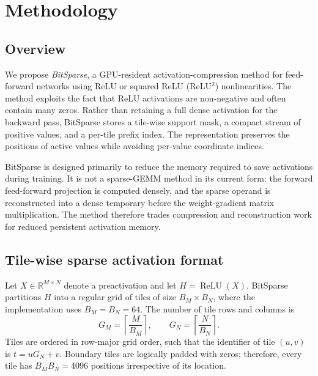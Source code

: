 
\section{Methodology}
\label{sec:methodology}

\subsection{Overview}

We propose \emph{BitSparse}, a GPU-resident activation-compression method for
feed-forward networks using ReLU or squared ReLU (ReLU$^2$) nonlinearities.
The method exploits the fact that ReLU activations are non-negative and often
contain many zeros.  Rather than retaining a full dense activation for the
backward pass, BitSparse stores a tile-wise support mask, a compact stream of
positive values, and a per-tile prefix index.  The representation preserves
the positions of active values while avoiding per-value coordinate indices.

BitSparse is designed primarily to reduce the memory required to save
activations during training.  It is not a sparse-GEMM method in its current
form: the forward feed-forward projection is computed densely, and the
sparse operand is reconstructed into a dense temporary before the
weight-gradient matrix multiplication.  The method therefore trades
compression and reconstruction work for reduced persistent activation memory.

\subsection{Tile-wise sparse activation format}
\label{sec:method-tile-format}

Let $X \in \mathbb{R}^{M \times N}$ denote a preactivation and let
$H = \operatorname{ReLU}(X)$.  BitSparse partitions $H$ into a regular grid
of tiles of size $B_M \times B_N$, where the implementation uses
$B_M=B_N=64$.  The number of tile rows and columns is
\begin{equation}
    G_M = \left\lceil \frac{M}{B_M} \right\rceil,
    \qquad
    G_N = \left\lceil \frac{N}{B_N} \right\rceil.
\end{equation}
Tiles are ordered in row-major grid order, such that the identifier of tile
$(u,v)$ is $t=uG_N+v$.  Boundary tiles are logically padded with zeros;
therefore, every tile has $B_MB_N=4096$ positions irrespective of its
location.

